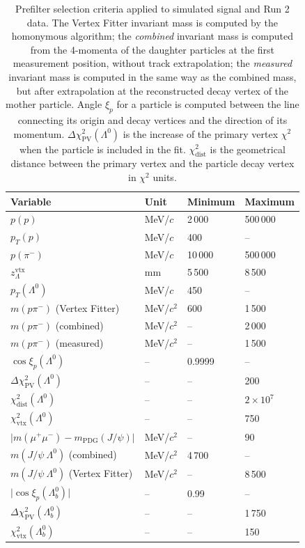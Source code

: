 \begin{table}[t]
	\begin{center}
	\begin{tabular}{@{}llll@{}}
		\toprule
		Variable & Unit & Minimum & Maximum \\
		\midrule
		$p(p)$ 						& MeV/$c$ 	& 2\,000	& 500\,000 \\
		$p_T(p)$ 					& MeV/$c$ 	& 400		& -- \\
		$p(\pi^-)$ 					& MeV/$c$ 	& 10\,000	& 500\,000 \\
		$z_\Lambda^\text{vtx}$		& mm		& 5\,500	& 8\,500 \\
		$p_T(\Lambda^0)$ 			& MeV/$c$ 	& 450		& -- \\
		$m(p\pi^-)$	(Vertex Fitter)	& MeV/$c^2$	& 600		& 1\,500 \\
		$m(p\pi^-)$	(combined)		& MeV/$c^2$	& --		& 2\,000 \\
		$m(p\pi^-)$	(measured)		& MeV/$c^2$	& --		& 1\,500 \\
		$\cos\xi_p (\Lambda^0)$		& --		& 0.9999	& -- \\
		$\Delta \chi^2_\text{PV} (\Lambda^0)$
									& -- 		& --		& 200 \\
		$\chi^2_\text{dist} (\Lambda^0)$
									& --		& --		& $2\times{10}^{7}$ \\
		$\chi^2_\text{vtx} (\Lambda^0)$
									& --		& --		& 750 \\
		$\lvert m(\mu^+ \mu^-) - m_\text{PDG} (J/\psi) \rvert$
									& MeV/$c^2$ & --		& 90 \\
		$m(J/\psi~\Lambda^0)$ (combined)
									& MeV/$c^2$	& 4\,700		& -- \\
		$m(J/\psi~\Lambda^0)$ (Vertex Fitter)
									& MeV/$c^2$	& --		& 8\,500 \\
		$\lvert \cos\xi_p (\Lambda^0_b) \rvert$
									& --		& 0.99		& -- \\
		$\Delta \chi^2_\text{PV} (\Lambda^0_b)$
									& -- 		& --		& 1\,750 \\
		$\chi^2_\text{vtx} (\Lambda^0_b)$
									& --		& --		& 150 \\
		\bottomrule
	\end{tabular}
	\end{center}
	\caption{Prefilter selection criteria applied to simulated \demonstratorshort signal and Run 2 data. The Vertex Fitter invariant mass is computed by the homonymous algorithm; the \textit{combined} invariant mass is computed from the 4-momenta of the daughter particles at the first measurement position, without track extrapolation; the \textit{measured} invariant mass is computed in the same way as the combined mass, but after extrapolation at the reconstructed decay vertex of the mother particle. Angle $\xi_p$ for a particle is computed between the line connecting its origin and decay vertices and the direction of its momentum. $\Delta \chi^2_\text{PV} (\Lambda^0)$ is the increase of the primary vertex $\chi^2$ when the particle is included in the fit. $\chi^2_\text{dist}$ is the geometrical distance between the primary vertex and the particle decay vertex in $\chi^2$ units.}
	\label{tab:4:prefilters}
\end{table}

